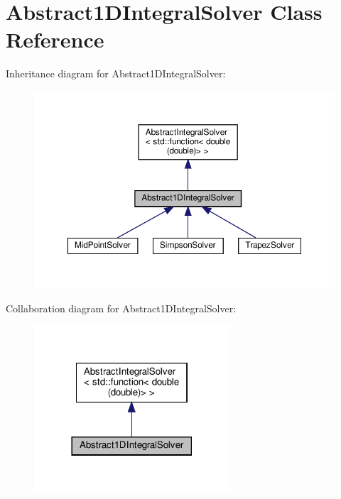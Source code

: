 \hypertarget{class_abstract1_d_integral_solver}{}\section{Abstract1\+D\+Integral\+Solver Class Reference}
\label{class_abstract1_d_integral_solver}


Inheritance diagram for Abstract1\+D\+Integral\+Solver\+:
\nopagebreak
\begin{figure}[H]
\begin{center}
\leavevmode
\includegraphics[width=350pt]{class_abstract1_d_integral_solver__inherit__graph}
\end{center}
\end{figure}


Collaboration diagram for Abstract1\+D\+Integral\+Solver\+:
\nopagebreak
\begin{figure}[H]
\begin{center}
\leavevmode
\includegraphics[width=206pt]{class_abstract1_d_integral_solver__coll__graph}
\end{center}
\end{figure}
